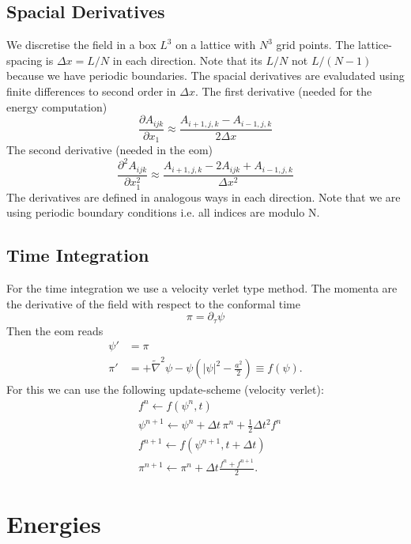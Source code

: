 \documentclass[a4paper]{article}
\begin{document}
\subsection{Spacial Derivatives}
We discretise the field in a box $L^3$ on a lattice with $N^3$ grid points. 
The lattice-spacing is $\Delta x = L / N$ in each direction. 
Note that its $L / N$ not $L / (N - 1)$ because we have periodic boundaries.
The spacial derivatives are evaludated using finite differences to second order in $\Delta x$.
The first derivative (needed for the energy computation)
\begin{equation}
	\frac{\partial A_{ijk}}{\partial x_1} \approx \frac{A_{i + 1,j,k} - A_{i - 1,j,k}}{2\Delta x}
\end{equation}
The second derivative (needed in the eom)
\begin{equation}
	\frac{\partial^2 A_{ijk}}{\partial x_1^2} \approx \frac{A_{i + 1,j,k} - 2 A_{ijk} + A_{i - 1,j,k}}{\Delta x^2}
\end{equation}
The derivatives are defined in analogous ways in each direction.
Note that we are using periodic boundary conditions i.e.  all indices are modulo N.


\subsection{Time Integration}
For the time integration we use a velocity verlet type method.
The momenta are the derivative of the field with respect to the conformal time
\begin{equation}
	\pi = \partial_\tau \psi
\end{equation} 
Then the eom reads
\begin{align}
	\psi' &= \pi \\
	\pi'  &= + \tilde{\nabla}^2 \psi - \psi ( |\psi|^2 - \frac{a^2}{2} ) \equiv f(\psi).
\end{align}
For this we can use the following update-scheme (velocity verlet):
\begin{align}
	&f^n \leftarrow f(\psi^n, t) \\
	&\psi^{n + 1} \leftarrow \psi^n + \Delta t \, \pi^n + \frac{1}{2} \Delta t^2 f^n \\
	&f^{n + 1} \leftarrow f(\psi^{n + 1}, t + \Delta t) \\
	&\pi^{n + 1} \leftarrow \pi^n + \Delta t \frac{f^n + f^{n + 1}}{2}.
\end{align}


\section{Energies}
\end{document}
